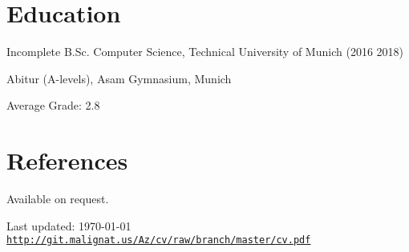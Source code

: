 \documentclass[a4paper]{article}
\def\footerlink{http://git.malignat.us/Az/cv/raw/branch/master/cv.pdf}
\renewenvironment{itemize}{
  \begin{list}{}{
    \setlength{\leftmargin}{1.5em}
  }
}{
  \end{list}
}
\newenvironment{packed}{
\begin{itemize}
  \setlength{\itemsep}{0pt}
  \setlength{\parskip}{0pt}
  \setlength{\parsep}{0pt}
}{\end{itemize}}
\begin{document}
\section*{Education}

\begin{itemize}
  \item Incomplete B.Sc. Computer Science, Technical University of Munich (2016
    {\textendash} 2018)

  \item Abitur (A-levels), Asam Gymnasium, Munich
	\begin{packed}
	\item Average Grade: 2.8
	\end{packed}
\end{itemize}


\section*{References}
Available on request.

\vfill

\begin{center}
  \begin{footnotesize}
    Last updated: \today \\
    \href{\footerlink}{\texttt{\footerlink}}
  \end{footnotesize}
\end{center}
\end{document}

